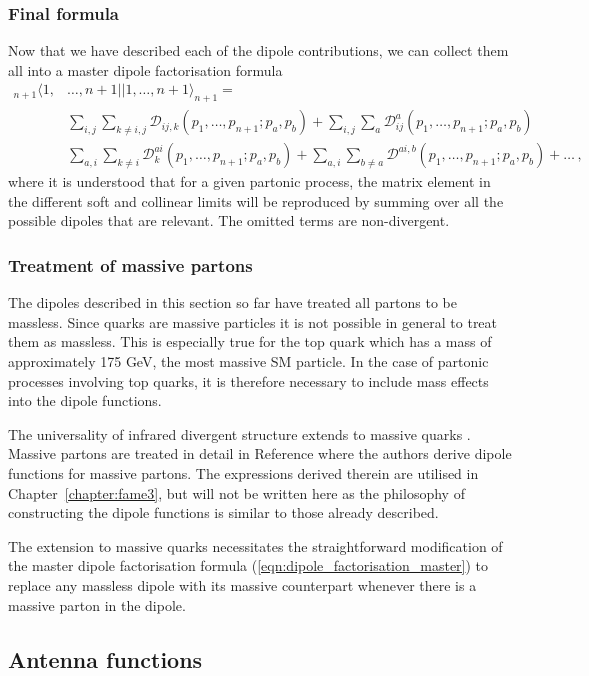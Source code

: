 \documentclass[main.tex]{subfiles}
\begin{document}
        \subsubsection{Final formula}
        Now that we have described each of the dipole contributions,
        we can collect them all into a master dipole factorisation
        formula
        \begin{equation}\label{eqn:dipole_factorisation_master}
            \begin{split}
            {}_{n+1} \langle 1, &\ldots, n+1 || 1, \ldots, n+1 \rangle_{n+1} = \\
            &\sum_{i,j}\sum_{k \neq i, j} \mathcal{D}_{ij,k}(p_{1},\ldots,p_{n+1};p_{a},p_{b}) + \sum_{i,j}\sum_{a} \mathcal{D}_{ij}^{a}(p_{1},\ldots,p_{n+1};p_{a},p_{b}) \\
            &\sum_{a,i}\sum_{k \neq i} \mathcal{D}_{k}^{ai}(p_{1},\ldots,p_{n+1};p_{a},p_{b}) + \sum_{a,i}\sum_{b \neq a} \mathcal{D}^{ai,b}(p_{1},\ldots,p_{n+1};p_{a},p_{b}) + \ldots \, ,
            \end{split}
        \end{equation}
        where it is understood that for a given partonic process,
        the matrix element in the different soft and collinear limits will be
        reproduced by summing over all the possible dipoles that are
        relevant. The omitted  terms are non-divergent.

        \subsubsection{Treatment of massive partons}
        The dipoles described in this section so far have
        treated all partons to be massless. Since quarks are massive
        particles it is not possible in general to treat them
        as massless. This is especially true for the top
        quark which has a mass of approximately 175 GeV, the
        most massive SM particle. In the case of partonic
        processes involving top quarks, it is therefore
        necessary to include mass effects into the dipole
        functions.

        The universality of infrared divergent structure
        extends to massive quarks \cite{Catani:2000ef}.
        Massive partons are treated in detail in Reference\cite{Catani:2002hc}
        where the authors derive dipole
        functions for massive partons. The expressions derived therein
        are utilised in Chapter~\ref{chapter:fame3}, but will
        not be written here as the philosophy of constructing
        the dipole functions is similar to those already described.

        The extension to massive quarks necessitates the straightforward
        modification of the master dipole factorisation formula
        (\ref{eqn:dipole_factorisation_master}) to replace
        any massless dipole with its massive counterpart whenever
        there is a massive parton in the dipole.

\subsection{Antenna functions}\label{sec:antenna_functions}
\end{document}

